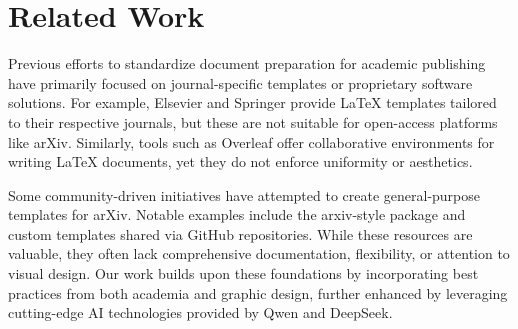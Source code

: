 \section{Related Work}
\label{sec:related_work}

Previous efforts to standardize document preparation for academic publishing have primarily focused on journal-specific templates or proprietary software solutions. For example, Elsevier and Springer provide LaTeX templates tailored to their respective journals, but these are not suitable for open-access platforms like arXiv. Similarly, tools such as Overleaf offer collaborative environments for writing LaTeX documents, yet they do not enforce uniformity or aesthetics.

Some community-driven initiatives have attempted to create general-purpose templates for arXiv. Notable examples include the arxiv-style package and custom templates shared via GitHub repositories. While these resources are valuable, they often lack comprehensive documentation, flexibility, or attention to visual design. Our work builds upon these foundations by incorporating best practices from both academia and graphic design, further enhanced by leveraging cutting-edge AI technologies provided by Qwen and DeepSeek.

